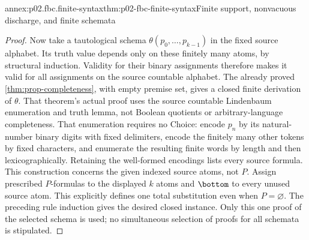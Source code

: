 \begin{annexitem}{annex:p02.fbc.finite-syntax}{thm:p02-fbc-finite-syntax}{Finite support, nonvacuous discharge, and finite schemata}
\begin{proof}
Now take a tautological schema \(\theta(p_0,\ldots,p_{k-1})\) in
the fixed source alphabet. Its truth value depends only on these
finitely many atoms, by structural induction. Validity for their
binary assignments therefore makes it valid for all assignments on
the source countable alphabet. The already proved
\cref{thm:prop-completeness}, with empty premise set, gives a closed
finite derivation of \(\theta\). That theorem's actual proof uses
the source countable Lindenbaum enumeration and truth lemma,
not Boolean quotients or arbitrary-language completeness.
That enumeration requires no Choice: encode \(p_n\) by its
natural-number binary digits with fixed delimiters, encode the
finitely many other tokens by fixed characters, and enumerate the
resulting finite words by length and then lexicographically.
Retaining the well-formed encodings lists every source formula.
This construction concerns the given indexed source atoms, not \(P\).
Assign prescribed \(P\)-formulas to the displayed \(k\) atoms and
\(\bottom\) to every unused source atom. This explicitly defines
one total substitution even when \(P=\varnothing\).
The preceding rule induction gives the desired closed instance.
Only this one proof of the selected schema is used; no simultaneous
selection of proofs for all schemata is stipulated.
\end{proof}
\end{annexitem}


